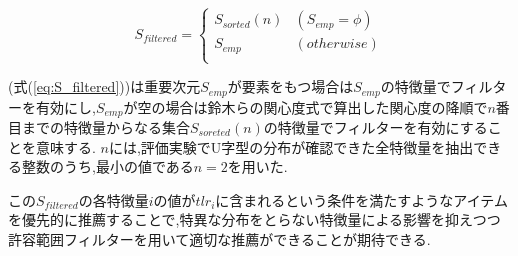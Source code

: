 \begin{equation}
\label{eq:S_filtered}
S_{filtered}=\left\{
  \begin{array}{ll}
    S_{sorted}(n) &(S_{emp}=\phi)\\
    S_{emp} &(otherwise)\\
  \end{array}\right.
\end{equation}
\par
(式(\ref{eq:S_filtered}))は重要次元$S_{emp}$が要素をもつ場合は$S_{emp}$の特徴量でフィルターを有効にし,$S_{emp}$が空の場合は鈴木らの関心度式で算出した関心度の降順で$n$番目までの特徴量からなる集合$S_{soreted}(n)$の特徴量でフィルターを有効にすることを意味する.
$n$には,評価実験でU字型の分布が確認できた全特徴量を抽出できる整数のうち,最小の値である$n=2$を用いた.\par
この$S_{filtered}$の各特徴量$i$の値が$tlr_i$に含まれるという条件を満たすようなアイテムを優先的に推薦することで,特異な分布をとらない特徴量による影響を抑えつつ許容範囲フィルターを用いて適切な推薦ができることが期待できる.
